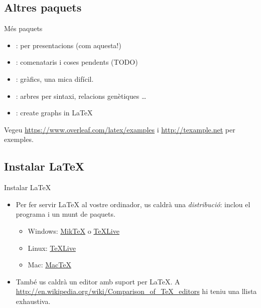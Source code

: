 \subsection{Altres paquets}
\begin{frame}{Més paquets}
\begin{itemize}
\item {}: per presentacions (com aquesta!)
\item {}: comenataris i coses pendents (TODO)
\item {}: gràfics, una mica difícil. 
\item {}: arbres per sintaxi, relacions genètiques \dots 
\item {}: create graphs in \LaTeX
\end{itemize}
Vegeu \url{https://www.overleaf.com/latex/examples} i \url{http://texample.net}
per exemples.
\end{frame}

\subsection{Instalar \LaTeX{}}
\begin{frame}{Instalar \LaTeX}
\begin{itemize}
\item Per fer servir \LaTeX{} al vostre ordinador, us caldrà una \emph{distribució}: 
    inclou el programa  i un munt de paquets. 
\begin{itemize}
\item Windows: \href{http://miktex.org/}{Mik\TeX} o \href{http://tug.org/texlive/}{\TeX Live}
\item Linux: \href{http://tug.org/texlive/}{\TeX Live}
\item Mac: \href{http://tug.org/mactex/}{Mac\TeX}
\end{itemize}
\item També us caldrà un editor amb suport per \LaTeX{}. A \url{http://en.wikipedia.org/wiki/Comparison_of_TeX_editors} hi teniu una llista exhaustiva.
\end{itemize}
\end{frame}

